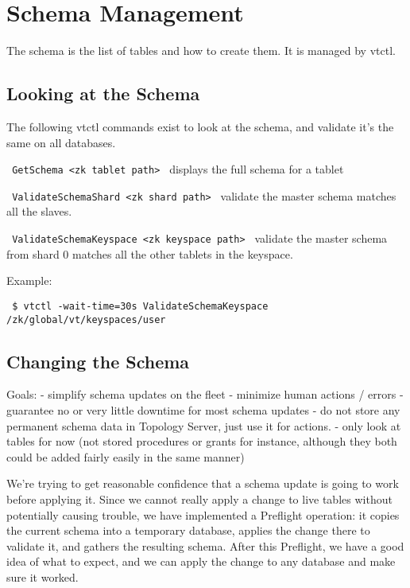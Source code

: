 \section{Schema Management}\hypertarget{schema-management}{}\label{schema-management}

The schema is the list of tables and how to create them. It is managed by vtctl.

\subsection{Looking at the Schema}\hypertarget{looking-at-the-schema}{}\label{looking-at-the-schema}

The following vtctl commands exist to look at the schema, and validate it's the same on all databases.

{\tt 
GetSchema \textless{}zk tablet path\textgreater{}
}
displays the full schema for a tablet

{\tt 
ValidateSchemaShard \textless{}zk shard path\textgreater{}
}
validate the master schema matches all the slaves.

{\tt 
ValidateSchemaKeyspace \textless{}zk keyspace path\textgreater{}
}
validate the master schema from shard 0 matches all the other tablets in the keyspace.

Example:

{\tt 
\$ vtctl -wait-time=30s ValidateSchemaKeyspace /zk/global/vt/keyspaces/user
}

\subsection{Changing the Schema}\hypertarget{changing-the-schema}{}\label{changing-the-schema}

Goals:
- simplify schema updates on the fleet
- minimize human actions / errors
- guarantee no or very little downtime for most schema updates
- do not store any permanent schema data in Topology Server, just use it for actions.
- only look at tables for now (not stored procedures or grants for instance, although they both could be added fairly easily in the same manner)

We’re trying to get reasonable confidence that a schema update is going to work before applying it. Since we cannot really apply a change to live tables without potentially causing trouble, we have implemented a Preflight operation: it copies the current schema into a temporary database, applies the change there to validate it, and gathers the resulting schema. After this Preflight, we have a good idea of what to expect, and we can apply the change to any database and make sure it worked.

